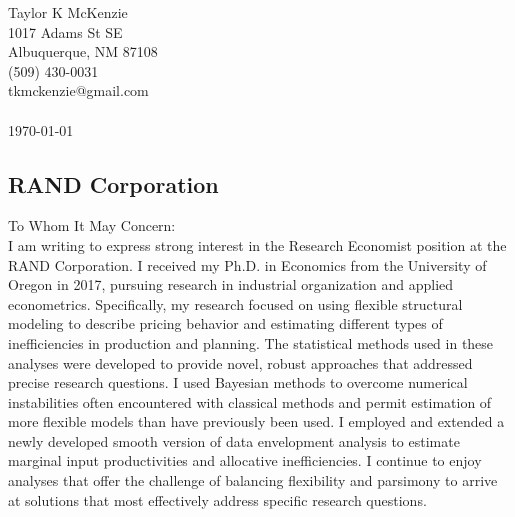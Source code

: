\documentclass[]{article}
\begin{document}
\thispagestyle{empty}

\noindent Taylor K McKenzie\\1017 Adams St SE\\ Albuquerque, NM 87108\\ (509) 430-0031\\ tkmckenzie@gmail.com\\ \\
\today

\subsection*{RAND Corporation}

To Whom It May Concern: \\

I am writing to express strong interest in the Research Economist position at the RAND Corporation. I received my Ph.D. in Economics from the University of Oregon in 2017, pursuing research in industrial organization and applied econometrics. Specifically, my research focused on using flexible structural modeling to describe pricing behavior and estimating different types of inefficiencies in production and planning. The statistical methods used in these analyses were developed to provide novel, robust approaches that addressed precise research questions. I used Bayesian methods to overcome numerical instabilities often encountered with classical methods and permit estimation of more flexible models than have previously been used. I employed and extended a newly developed smooth version of data envelopment analysis to estimate marginal input productivities and allocative inefficiencies. I continue to enjoy analyses that offer the challenge of balancing flexibility and parsimony to arrive at solutions that most effectively address specific research questions.\\
\end{document}
